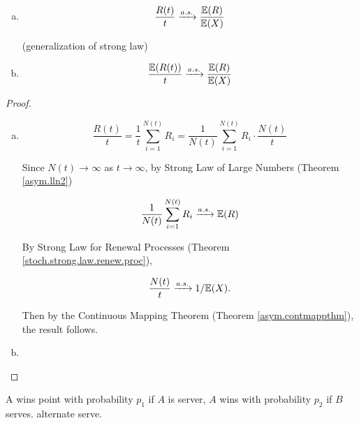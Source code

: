 \begin{proposition}\label{stoch.prop.7.3}

\

\begin{enumerate}[(a)]

\item 

\[
\frac{R(t)}{t} \xrightarrow{a.s.} \frac{\E(R)}{\E(X)}
\]

(generalization of strong law)

\item 


\[
\frac{\E(R(t))}{t} \xrightarrow{a.s.} \frac{\E(R)}{\E(X)}
\]

\end{enumerate}

\end{proposition}

\begin{proof}

\begin{enumerate}[(a)]

\item 

\[
\frac{R(t) }{t} = \frac{1}{t}  \sum_{i=1}^{N(t)} R_i = \frac{1}{N(t) }   \sum_{i=1}^{N(t)} R_i \cdot \frac{N(t)}{t}
\]

Since \(N(t) \to \infty\) as \(t \to \infty\), by Strong Law of Large Numbers (Theorem \ref{asym.lln2})

\[
 \frac{1}{N(t) }   \sum_{i=1}^{N(t)} R_i  \xrightarrow{a.s.} \E(R)
 \]
 
 By Strong Law for Renewal Processes (Theorem \ref{stoch.strong.law.renew.proc}), 
 
 \[
  \frac{N(t)}{t} \xrightarrow{a.s.} 1/\E(X).
\]

Then by the Continuous Mapping Theorem (Theorem \ref{asym.contmappthm}), the result follows.
\item

\end{enumerate}

\end{proof}

\begin{example} A wins point with probability \(p_1\) if \(A\) is server, \(A\) wins with probability \(p_2\) if \(B\) serves. alternate serve.

\end{example}

